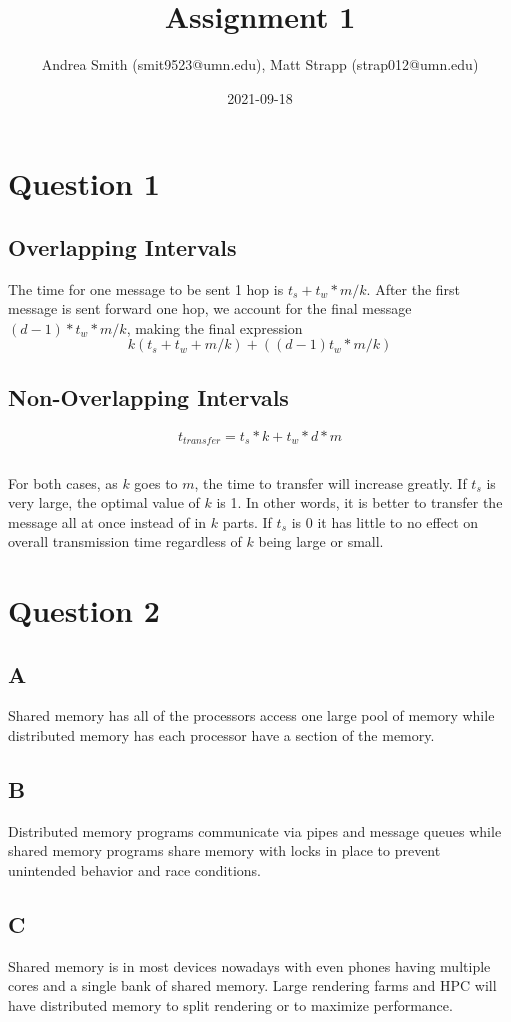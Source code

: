 \documentclass[12pt]{article}
\title{Assignment 1}
\author{Andrea Smith (smit9523@umn.edu), Matt Strapp (strap012@umn.edu)}
\date{2021-09-18}
\begin{document}
\maketitle
    \section{Question 1}
    \subsection*{Overlapping Intervals}
    The time for one message to be sent 1 hop is \(t_s+t_w*m/k\). After the first message is sent forward one hop, we account for the final message \((d-1)*t_w*m/k\), making the final expression
    \[k(t_s+t_w+m/k)+((d-1)t_w*m/k)\]
    \subsection*{Non-Overlapping Intervals}
        \[t_{transfer} = t_s*k+t_w*d*m\]
    \subsection*{}
        For both cases, as \(k\) goes to \(m\), the time to transfer will increase greatly. If \(t_s\) is very large, the optimal value of \(k\) is 1. In other words, it is better to transfer the message all at once instead of in \(k\) parts. If \(t_s\) is 0 it has little to no effect on overall transmission time regardless of \(k\) being large or small.
    \section{Question 2}
    \subsection*{A}
    Shared memory has all of the processors access one large pool of memory while distributed memory has each processor have a section of the memory.
    \subsection*{B}
    Distributed memory programs communicate via pipes and message queues while shared memory programs share memory with locks in place to prevent unintended behavior and race conditions.
    \subsection*{C}
    Shared memory is in most devices nowadays with even phones having multiple cores and a single bank of shared memory. Large rendering farms and HPC will have distributed memory to split rendering or to maximize performance.
\end{document}
